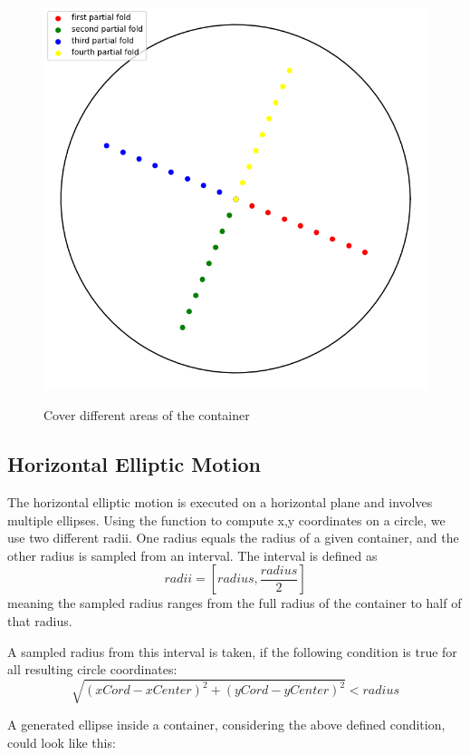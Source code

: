 \begin{figure}[H]
    \includegraphics[scale=0.35]{Graphics/motions/folding1.png}
    \centering
    \label{fig:foldingMotion1}
    \caption{Cover different areas of the container}
\end{figure}

\subsection{Horizontal Elliptic Motion}
The horizontal elliptic motion is executed on a horizontal plane and involves multiple ellipses.
Using the function to compute x,y coordinates on a circle, we use two different radii.
One radius equals the radius of a given container, and the other radius is sampled from an interval. The interval is defined as \[radii = [radius, \frac{radius} {2} ]\]
meaning the sampled radius ranges from the full radius of the container to half of that radius.

A sampled radius from this interval is taken, if the following condition is true for all resulting circle coordinates:
\[\sqrt{(xCord - xCenter)^2 + (yCord - yCenter)^2} < radius\] 

A generated ellipse inside a container, considering the above defined condition, could look like this:

